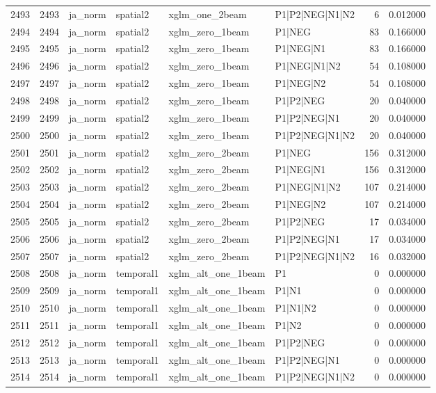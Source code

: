 \begin{tabular}{lrllllrr}
2493 & 2493 & ja_norm & spatial2 & xglm_one_2beam & P1|P2|NEG|N1|N2 & 6 & 0.012000 \\
2494 & 2494 & ja_norm & spatial2 & xglm_zero_1beam & P1|NEG & 83 & 0.166000 \\
2495 & 2495 & ja_norm & spatial2 & xglm_zero_1beam & P1|NEG|N1 & 83 & 0.166000 \\
2496 & 2496 & ja_norm & spatial2 & xglm_zero_1beam & P1|NEG|N1|N2 & 54 & 0.108000 \\
2497 & 2497 & ja_norm & spatial2 & xglm_zero_1beam & P1|NEG|N2 & 54 & 0.108000 \\
2498 & 2498 & ja_norm & spatial2 & xglm_zero_1beam & P1|P2|NEG & 20 & 0.040000 \\
2499 & 2499 & ja_norm & spatial2 & xglm_zero_1beam & P1|P2|NEG|N1 & 20 & 0.040000 \\
2500 & 2500 & ja_norm & spatial2 & xglm_zero_1beam & P1|P2|NEG|N1|N2 & 20 & 0.040000 \\
2501 & 2501 & ja_norm & spatial2 & xglm_zero_2beam & P1|NEG & 156 & 0.312000 \\
2502 & 2502 & ja_norm & spatial2 & xglm_zero_2beam & P1|NEG|N1 & 156 & 0.312000 \\
2503 & 2503 & ja_norm & spatial2 & xglm_zero_2beam & P1|NEG|N1|N2 & 107 & 0.214000 \\
2504 & 2504 & ja_norm & spatial2 & xglm_zero_2beam & P1|NEG|N2 & 107 & 0.214000 \\
2505 & 2505 & ja_norm & spatial2 & xglm_zero_2beam & P1|P2|NEG & 17 & 0.034000 \\
2506 & 2506 & ja_norm & spatial2 & xglm_zero_2beam & P1|P2|NEG|N1 & 17 & 0.034000 \\
2507 & 2507 & ja_norm & spatial2 & xglm_zero_2beam & P1|P2|NEG|N1|N2 & 16 & 0.032000 \\
2508 & 2508 & ja_norm & temporal1 & xglm_alt_one_1beam & P1 & 0 & 0.000000 \\
2509 & 2509 & ja_norm & temporal1 & xglm_alt_one_1beam & P1|N1 & 0 & 0.000000 \\
2510 & 2510 & ja_norm & temporal1 & xglm_alt_one_1beam & P1|N1|N2 & 0 & 0.000000 \\
2511 & 2511 & ja_norm & temporal1 & xglm_alt_one_1beam & P1|N2 & 0 & 0.000000 \\
2512 & 2512 & ja_norm & temporal1 & xglm_alt_one_1beam & P1|P2|NEG & 0 & 0.000000 \\
2513 & 2513 & ja_norm & temporal1 & xglm_alt_one_1beam & P1|P2|NEG|N1 & 0 & 0.000000 \\
2514 & 2514 & ja_norm & temporal1 & xglm_alt_one_1beam & P1|P2|NEG|N1|N2 & 0 & 0.000000 \\

\end{tabular}

